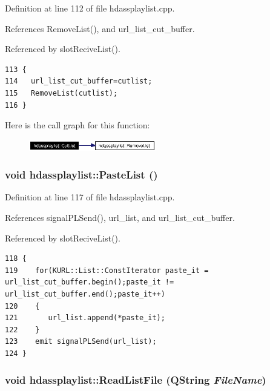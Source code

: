 Definition at line 112 of file hdassplaylist.cpp.

References Remove\-List(), and url\_\-list\_\-cut\_\-buffer.

Referenced by slot\-Recive\-List().



\footnotesize\begin{verbatim}113 {  
114   url_list_cut_buffer=cutlist;
115   RemoveList(cutlist);
116 }
\end{verbatim}\normalsize 


Here is the call graph for this function:\begin{figure}[H]
\begin{center}
\leavevmode
\includegraphics[width=157pt]{classhdassplaylist_hdassplaylistd1_cgraph}
\end{center}
\end{figure}
\subsubsection{\setlength{\rightskip}{0pt plus 5cm}void hdassplaylist::Paste\-List ()\hspace{0.3cm}{\tt  [private]}}\label{classhdassplaylist_hdassplaylistd2}




Definition at line 117 of file hdassplaylist.cpp.

References signal\-PLSend(), url\_\-list, and url\_\-list\_\-cut\_\-buffer.

Referenced by slot\-Recive\-List().



\footnotesize\begin{verbatim}118 {
119    for(KURL::List::ConstIterator paste_it = url_list_cut_buffer.begin();paste_it != url_list_cut_buffer.end();paste_it++)
120    {
121       url_list.append(*paste_it);
122    }
123    emit signalPLSend(url_list);
124 }
\end{verbatim}\normalsize 
{}
\subsubsection{\setlength{\rightskip}{0pt plus 5cm}void hdassplaylist::Read\-List\-File (QString {\em File\-Name})}\label{classhdassplaylist_hdassplaylista3}





